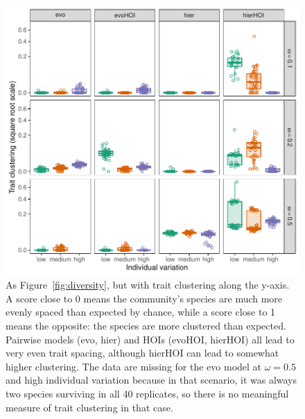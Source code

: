 \documentclass[11pt]{article}
\begin{document}
\begin{figure}[p]
  \centering
  \includegraphics[width=\textwidth]{clustering.pdf}
  \caption{As Figure~\ref{fig:diversity}, but with trait clustering along the y-axis. A score close to 0 means the community's species are much more evenly spaced than expected by chance, while a score close to 1 means the opposite: the species are more clustered than expected. Pairwise models (evo, hier) and HOIs (evoHOI, hierHOI) all lead to very even trait spacing, although hierHOI can lead to somewhat higher clustering. The data are missing for the evo model at $\omega = 0.5$ and high individual variation because in that scenario, it was always two species surviving in all 40 replicates, so there is no meaningful measure of trait clustering in that case.}
  \label{fig:clustering}
\end{figure}
\end{document}

